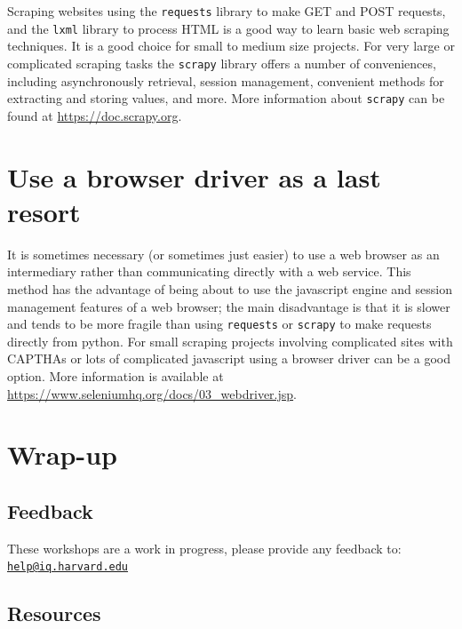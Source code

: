 \documentclass[]{book}
\begin{document}
Scraping websites using the \texttt{requests} library to make GET and
POST requests, and the \texttt{lxml} library to process HTML is a good
way to learn basic web scraping techniques. It is a good choice for
small to medium size projects. For very large or complicated scraping
tasks the \texttt{scrapy} library offers a number of conveniences,
including asynchronously retrieval, session management, convenient
methods for extracting and storing values, and more. More information
about \texttt{scrapy} can be found at \url{https://doc.scrapy.org}.

\section{Use a browser driver as a last
resort}\label{use-a-browser-driver-as-a-last-resort}

It is sometimes necessary (or sometimes just easier) to use a web
browser as an intermediary rather than communicating directly with a web
service. This method has the advantage of being about to use the
javascript engine and session management features of a web browser; the
main disadvantage is that it is slower and tends to be more fragile than
using \texttt{requests} or \texttt{scrapy} to make requests directly
from python. For small scraping projects involving complicated sites
with CAPTHAs or lots of complicated javascript using a browser driver
can be a good option. More information is available at
\url{https://www.seleniumhq.org/docs/03_webdriver.jsp}.

\section{Wrap-up}\label{wrap-up-6}

\subsection{Feedback}\label{feedback-6}

These workshops are a work in progress, please provide any feedback to:
\href{mailto:help@iq.harvard.edu}{\nolinkurl{help@iq.harvard.edu}}

\subsection{Resources}\label{resources-6}
\end{document}
